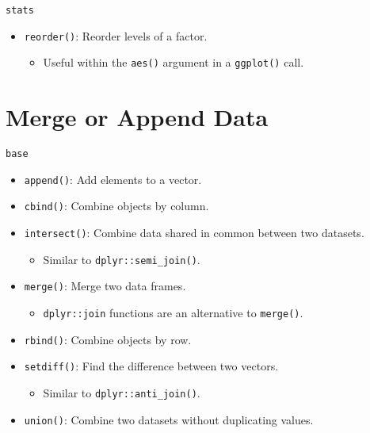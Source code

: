 \documentclass[
]{book}
\providecommand{\tightlist}{%
  \setlength{\itemsep}{0pt}\setlength{\parskip}{0pt}}
\begin{document}
\texttt{stats}

\begin{itemize}
\tightlist
\item
  \texttt{reorder()}: Reorder levels of a factor.

  \begin{itemize}
  \tightlist
  \item
    Useful within the \texttt{aes()} argument in a \texttt{ggplot()} call.
  \end{itemize}
\end{itemize}

\hypertarget{merge-or-append-data}{%
\section{Merge or Append Data}\label{merge-or-append-data}}

\texttt{base}

\begin{itemize}
\tightlist
\item
  \texttt{append()}: Add elements to a vector.
\item
  \texttt{cbind()}: Combine objects by column.
\item
  \texttt{intersect()}: Combine data shared in common between two datasets.

  \begin{itemize}
  \tightlist
  \item
    Similar to \texttt{dplyr::semi\_join()}.
  \end{itemize}
\item
  \texttt{merge()}: Merge two data frames.

  \begin{itemize}
  \tightlist
  \item
    \texttt{dplyr::join} functions are an alternative to \texttt{merge()}.
  \end{itemize}
\item
  \texttt{rbind()}: Combine objects by row.
\item
  \texttt{setdiff()}: Find the difference between two vectors.

  \begin{itemize}
  \tightlist
  \item
    Similar to \texttt{dplyr::anti\_join()}.
  \end{itemize}
\item
  \texttt{union()}: Combine two datasets without duplicating values.
\end{itemize}
\end{document}
